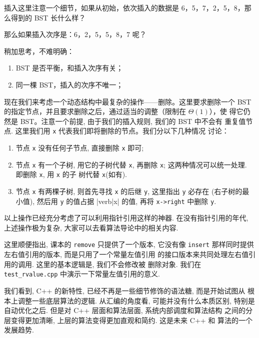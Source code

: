 \documentclass[a4paper]{ctexart}
\theoremstyle{definition}
\theoremstyle{definition}
\begin{document}
插入这里注意一个细节，如果从初始，依次插入的数据是 6，5，7，2，5，8，那么得到的 BST 长什么样？


那么如果插入次序是：6，2，5，5，8，7 呢？


稍加思考，不难明确：

\begin{enumerate}
\item BST 是否平衡，和插入次序有关；
\item 同一棵 BST，插入的次序不唯一；
\end{enumerate}

现在我们来考虑一个动态结构中最复杂的操作——删除。这里要求删除一个 BST
的指定节点，并且要求删除之后，通过适当的调整（限制在 $\Theta(1)$），使
得它仍然是 BST。注意一个前提, 由于我们的插入规则, 我们的 BST 中不会有
重复值节点. 这里我们用 \verb|x| 代表我们即将删除的节点。我们分以下几种情况
讨论：

\begin{enumerate}
\item 节点 \verb|x| 没有任何子节点, 直接删除 \verb|x| 即可; 
\item 节点 \verb|x| 有一个子树, 用它的子树代替 \verb|x|, 再删除
  \verb|x|; 这两种情况可以统一处理. 即删除 \verb|x|, 用 \verb|x| 的子
  树代替 \verb|x|(如有).
\item 节点 \verb|x| 有两棵子树, 则首先寻找 \verb|x| 的后继 \verb|y|,
  这里指出 \verb|y| 必存在 (右子树的最小值), 然后用 \verb|y| 的值占据
  |verb|x| 的值, 再将 \verb|x->right| 中删除 \verb|y|.
\end{enumerate}

以上操作已经充分考虑了可以利用指针引用这样的神器. 在没有指针引用的年代,
上述操作极为复杂, 大家可以去看算法导论中的相关内容.

这里顺便指出, 课本的 \verb|remove| 只提供了一个版本, 它没有像
\verb|insert| 那样同时提供左右值引用的版本, 而是只用了一个常量左值引用
的接口版本来共同处理左右值引用的调用. 这里的基本逻辑是, 我们不会修改被
删除对象. 我们在 \verb|test_rvalue.cpp| 中演示一下常量左值引用的意义.

我们看到, C++ 的新特性, 已经不再是一些细节修饰的语法糖, 而是开始试图从
根本上调整一些底层算法的逻辑. 从汇编的角度看, 可能并没有什么本质区别,
特别是自动优化之后. 但是对 C++ 层面和算法层面, 系统内部调度和算法结构
之间的分层变得更加清晰, 上层的算法变得更加直观和简约. 这是未来 C++ 和
算法的一个发展趋势. 
\end{document}
